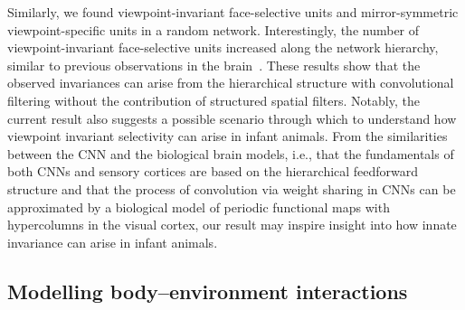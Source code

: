 \documentclass[sn-mathphys-num]{sn-jnl}%
\theoremstyle{thmstyleone}%
\theoremstyle{thmstyletwo}%
\theoremstyle{thmstylethree}%
\begin{document}
Similarly, we found viewpoint-invariant face-selective units and mirror-symmetric viewpoint-specific units in a random network.
Interestingly, the number of viewpoint-invariant face-selective units increased along the network hierarchy, similar to previous observations in the brain~\cite{freiwald2010functional}.
These results show that the observed invariances can arise from the hierarchical structure with convolutional filtering without the contribution of structured spatial filters.
Notably, the current result also suggests a possible scenario through which to understand how viewpoint invariant selectivity can arise in infant animals.
From the similarities between the CNN and the biological brain models, i.e., that the fundamentals of both CNNs and sensory cortices are based on the hierarchical feedforward structure and that the process of convolution via weight sharing in CNNs can be approximated by a biological model of periodic functional maps with hypercolumns in the visual cortex,
our result may inspire insight into how innate invariance can arise in infant animals.


\subsection{Modelling body–environment interactions}\label{subsec2}
\end{document}
